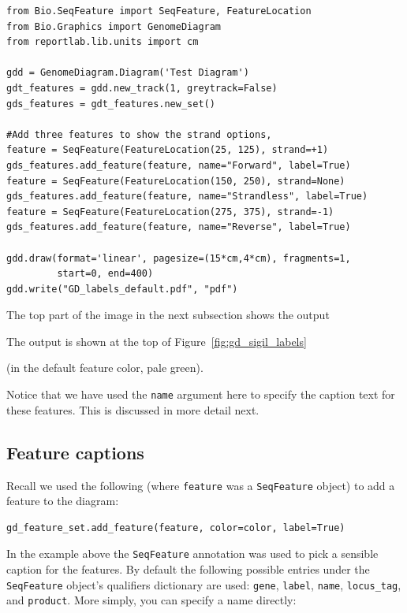 \documentclass{report}
\begin{document}
\begin{verbatim}
from Bio.SeqFeature import SeqFeature, FeatureLocation
from Bio.Graphics import GenomeDiagram
from reportlab.lib.units import cm

gdd = GenomeDiagram.Diagram('Test Diagram')
gdt_features = gdd.new_track(1, greytrack=False)
gds_features = gdt_features.new_set()

#Add three features to show the strand options,
feature = SeqFeature(FeatureLocation(25, 125), strand=+1)
gds_features.add_feature(feature, name="Forward", label=True)
feature = SeqFeature(FeatureLocation(150, 250), strand=None)
gds_features.add_feature(feature, name="Strandless", label=True)
feature = SeqFeature(FeatureLocation(275, 375), strand=-1)
gds_features.add_feature(feature, name="Reverse", label=True)

gdd.draw(format='linear', pagesize=(15*cm,4*cm), fragments=1,
         start=0, end=400)
gdd.write("GD_labels_default.pdf", "pdf")
\end{verbatim}

\begin{htmlonly}
The top part of the image in the next subsection shows the output
\end{htmlonly}
\begin{latexonly}
The output is shown at the top of Figure~\ref{fig:gd_sigil_labels}
\end{latexonly}
(in the default feature color, pale green).

Notice that we have used the \texttt{name} argument here to specify the
caption text for these features.  This is discussed in more detail next.

\subsection{Feature captions}
\label{sec:gd_feature_captions}

Recall we used the following (where \texttt{feature} was a
\verb|SeqFeature| object) to add a feature to the diagram:

\begin{verbatim}
gd_feature_set.add_feature(feature, color=color, label=True)
\end{verbatim}

In the example above the \verb|SeqFeature| annotation was used to pick a
sensible caption for the features.  By default the following possible entries
under the \verb|SeqFeature| object's qualifiers dictionary are used:
\texttt{gene}, \texttt{label}, \texttt{name}, \texttt{locus\_tag}, and
\texttt{product}.  More simply, you can specify a name directly:
\end{document}
